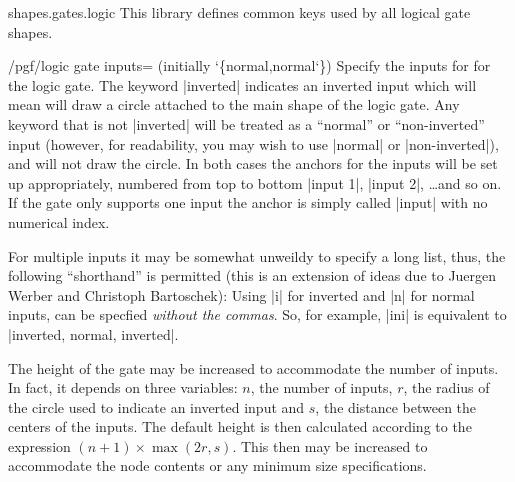 \begin{pgflibrary}{shapes.gates.logic}
  This library defines common keys used by all logical gate shapes.

\begin{key}{/pgf/logic gate inputs= (initially \char`\{normal,normal\char`\})}
  \label{logic-gate-inputs}%
  Specify the inputs for for the logic gate. The keyword |inverted|
  indicates an inverted input which will mean \pgfname{} will draw a
  circle attached to the main shape of the logic gate. Any keyword
  that is not |inverted| will be treated as a ``normal'' or 
  ``non-inverted'' input (however, for readability, you may wish to 
  use |normal| or |non-inverted|), and \pgfname{} will not draw the 
  circle.  
  In both cases the anchors for the inputs will be set 
  up appropriately, numbered from top to bottom |input 1|, |input 2|,
  \ldots and so on. If the gate only supports one input the anchor
  is simply called |input| with no numerical index.
  
\begin{codeexample}[]
\end{codeexample} 
  
  For multiple inputs it may be somewhat unweildy to specify a long
  list, thus, the following ``shorthand'' is permitted (this is an  
  extension of ideas due to Juergen Werber and Christoph Bartoschek):
  Using |i| for inverted and |n| for normal inputs, 
  can be specfied \emph{without the commas}. So, for example,
  |ini| is equivalent to |inverted, normal, inverted|.
  
\begin{codeexample}[]
\end{codeexample} 
 
\end{key}

The height of the gate may be increased to accommodate the number 
of inputs. In fact, it depends on three variables:
$n$, the number of inputs, $r$, the radius of the circle used
to indicate an inverted input and $s$, the distance between
the centers of the inputs.
The default height is then calculated according to the expression 
$(n+1)\times\max(2r,s)$. This then may
be increased to accommodate the node contents or any
minimum size specifications.


\end{pgflibrary}

